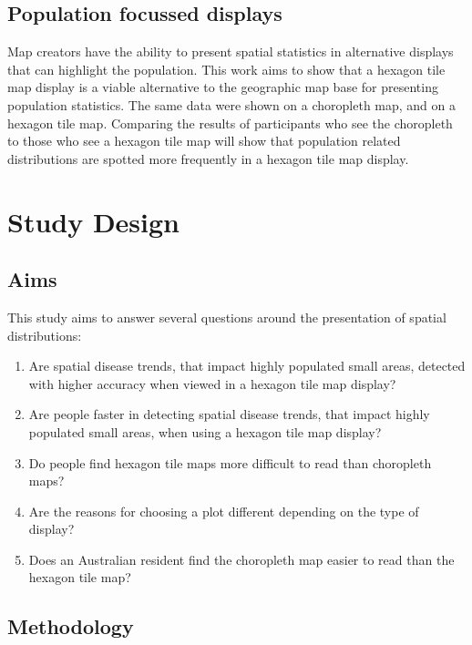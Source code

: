 \documentclass[conference,final,]{IEEEtran}
\begin{document}
\hypertarget{population-focussed-displays}{%
\subsection{Population focussed
displays}\label{population-focussed-displays}}

Map creators have the ability to present spatial statistics in
alternative displays that can highlight the population. This work aims
to show that a hexagon tile map display is a viable alternative to the
geographic map base for presenting population statistics. The same data
were shown on a choropleth map, and on a hexagon tile map. Comparing the
results of participants who see the choropleth to those who see a
hexagon tile map will show that population related distributions are
spotted more frequently in a hexagon tile map display.

\hypertarget{study-design}{%
\section{Study Design}\label{study-design}}

\hypertarget{aims}{%
\subsection{Aims}\label{aims}}

This study aims to answer several questions around the presentation of
spatial distributions:

\begin{enumerate}
\def\labelenumi{\arabic{enumi}.}
\item
  Are spatial disease trends, that impact highly populated small areas,
  detected with higher accuracy when viewed in a hexagon tile map
  display?
\item
  Are people faster in detecting spatial disease trends, that impact
  highly populated small areas, when using a hexagon tile map display?
\item
  Do people find hexagon tile maps more difficult to read than
  choropleth maps?
\item
  Are the reasons for choosing a plot different depending on the type of
  display?
\item
  Does an Australian resident find the choropleth map easier to read
  than the hexagon tile map?
\end{enumerate}

\hypertarget{methodology}{%
\subsection{Methodology}\label{methodology}}
\end{document}
